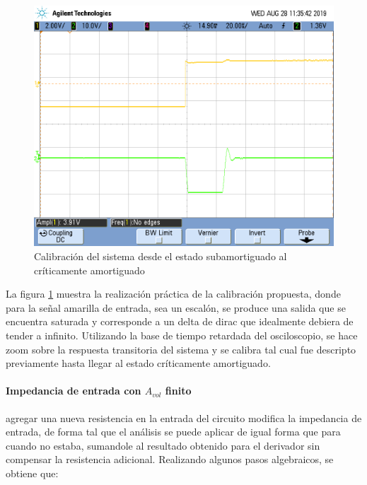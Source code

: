 \begin{figure}[H]
	\includegraphics[scale=0.2]{Derivador/Mediciones/Osciloscopio/PCB_Compensado/Calibracion/scope_15.png} 
	\caption{Calibraci\'on del sistema desde el estado subamortiguado al cr\'iticamente amortiguado}
	\label{fig:calibracion_derivador}
\end{figure}

La figura \ref{fig:calibracion_derivador} muestra la realizaci\'on pr\'actica de la calibraci\'on propuesta, donde para la se\~nal amarilla de entrada, sea un escal\'on,
se produce una salida que se encuentra saturada y corresponde a un delta de dirac que idealmente debiera de tender a infinito. Utilizando la base de tiempo retardada del osciloscopio, se hace
zoom sobre la respuesta transitoria del sistema y se calibra tal cual fue descripto previamente hasta llegar al estado cr\'iticamente amortiguado.

\paragraph*{Impedancia de entrada con $A_{vol}$ finito} agregar una nueva resistencia en la entrada del circuito modifica la impedancia de entrada, de forma tal que el an\'alisis se puede aplicar de igual forma que para cuando no estaba, sumandole al resultado obtenido para el derivador sin compensar la resistencia adicional. Realizando algunos pasos algebraicos, se obtiene que:

